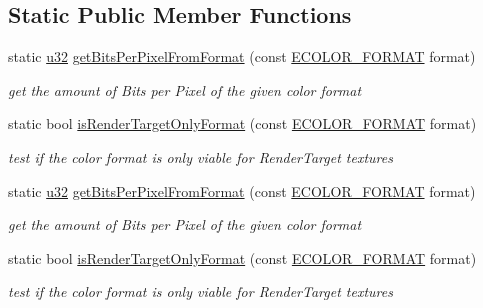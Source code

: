 \subsection*{Static Public Member Functions}
\begin{DoxyCompactItemize}
\item 
\mbox{\label{classirr_1_1video_1_1IImage_a70b50ef1bbb6f90ec4c43a91f521c2b6}} 
static \hyperlink{namespaceirr_a0416a53257075833e7002efd0a18e804}{u32} \hyperlink{classirr_1_1video_1_1IImage_a70b50ef1bbb6f90ec4c43a91f521c2b6}{get\+Bits\+Per\+Pixel\+From\+Format} (const \hyperlink{namespaceirr_1_1video_a1d5e487888c32b1674a8f75116d829ed}{E\+C\+O\+L\+O\+R\+\_\+\+F\+O\+R\+M\+AT} format)
\begin{DoxyCompactList}\small\item\em get the amount of Bits per Pixel of the given color format \end{DoxyCompactList}\item 
static bool \hyperlink{classirr_1_1video_1_1IImage_aafbd373ef15670708010e0064ae3b946}{is\+Render\+Target\+Only\+Format} (const \hyperlink{namespaceirr_1_1video_a1d5e487888c32b1674a8f75116d829ed}{E\+C\+O\+L\+O\+R\+\_\+\+F\+O\+R\+M\+AT} format)
\begin{DoxyCompactList}\small\item\em test if the color format is only viable for Render\+Target textures \end{DoxyCompactList}\item 
\mbox{\label{classirr_1_1video_1_1IImage_a70b50ef1bbb6f90ec4c43a91f521c2b6}} 
static \hyperlink{namespaceirr_a0416a53257075833e7002efd0a18e804}{u32} \hyperlink{classirr_1_1video_1_1IImage_a70b50ef1bbb6f90ec4c43a91f521c2b6}{get\+Bits\+Per\+Pixel\+From\+Format} (const \hyperlink{namespaceirr_1_1video_a1d5e487888c32b1674a8f75116d829ed}{E\+C\+O\+L\+O\+R\+\_\+\+F\+O\+R\+M\+AT} format)
\begin{DoxyCompactList}\small\item\em get the amount of Bits per Pixel of the given color format \end{DoxyCompactList}\item 
static bool \hyperlink{classirr_1_1video_1_1IImage_aafbd373ef15670708010e0064ae3b946}{is\+Render\+Target\+Only\+Format} (const \hyperlink{namespaceirr_1_1video_a1d5e487888c32b1674a8f75116d829ed}{E\+C\+O\+L\+O\+R\+\_\+\+F\+O\+R\+M\+AT} format)
\begin{DoxyCompactList}\small\item\em test if the color format is only viable for Render\+Target textures \end{DoxyCompactList}\end{DoxyCompactItemize}
